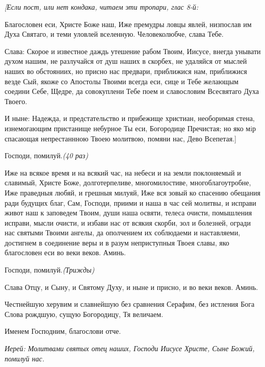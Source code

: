 \itshape [Если пост, или нет кондака, читаем эти тропари, глас 8-\normalfont{}й:



Благословен еси, Христе Боже наш, Иже премудры ловцы явлей, низпослав им Духа Святаго, и теми уловлей вселенную. Человеколюбче, слава Тебе.



Слава: Скорое и известное даждь утешение рабом Твоим, Иисусе, внегда унывати духом нашим, не разлучайся от душ наших в скорбех, не удаляйся от мыслей наших во обстояниих, но присно нас предвари, приближися нам, приближися везде Сый, якоже со Апостолы Твоими всегда еси, сице и Тебе желающым соедини Себе, Щедре, да совокуплени Тебе поем и славословим Всесвятаго Духа Твоего.



И ныне: Надежда, и предстательство и прибежище христиан, необоримая стена, изнемогающим пристанище небурное Ты еси, Богородице Пречистая; но яко мiр спасающая непрестаннною Твоею молитвою, помяни нас, Дево Всепетая.]



Господи, помилуй.\itshape  (40 раз)\normalfont{}



Иже на всякое время и на всякий час, на небеси и на земли поклоняемый и славимый, Христе Боже, долготерпеливе, многомилостиве, многоблагоутробне, Иже праведныя любяй, и грешныя милуяй, Иже вся зовый ко спасению обещания ради будущих благ, Сам, Господи, приими и наша в час сей молитвы, и исправи живот наш к заповедем Твоим, души наша освяти, телеса очисти, помышления исправи, мысли очисти, и избави нас от всякия скорби, зол и болезней, огради нас святыми Твоими ангелы, да ополчением их соблюдаеми и наставляеми, достигнем в соединение веры и в разум неприступныя Твоея славы, яко благословен еси во веки веков. Аминь.



Господи, помилуй.\itshape  (Трижды)\normalfont{}



Слава Отцу, и Сыну, и Святому Духу, и ныне и присно, и во веки веков. Аминь.



Честнейшую херувим и славнейшую без сравнения Серафим, без истления Бога Слова рождшую, сущую Богородицу, Тя величаем.



Именем Господним, благослови отче.


\itshape Иерей:\normalfont{} Молитвами святых отец наших, Господи Иисусе Христе, Сыне Божий, помилуй нас.


